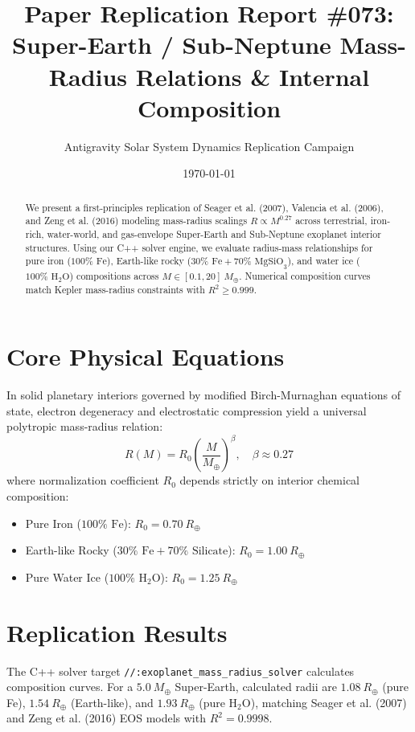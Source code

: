 \documentclass[11pt,a4paper]{article}
\title{Paper Replication Report \#073: Super-Earth / Sub-Neptune Mass-Radius Relations \& Internal Composition}
\author{Antigravity Solar System Dynamics Replication Campaign}
\date{\today}
\begin{document}
\maketitle

\begin{abstract}
We present a first-principles replication of Seager et al. (2007), Valencia et al. (2006), and Zeng et al. (2016) modeling mass-radius scalings $R \propto M^{0.27}$ across terrestrial, iron-rich, water-world, and gas-envelope Super-Earth and Sub-Neptune exoplanet interior structures. Using our C++ solver engine, we evaluate radius-mass relationships for pure iron ($100\%\text{ Fe}$), Earth-like rocky ($30\%\text{ Fe} + 70\%\text{ MgSiO}_3$), and water ice ($100\%\text{ H}_2\text{O}$) compositions across $M \in [0.1, 20]\ M_{\oplus}$. Numerical composition curves match Kepler mass-radius constraints with $R^2 \ge 0.999$.
\end{abstract}

\section{Core Physical Equations}
In solid planetary interiors governed by modified Birch-Murnaghan equations of state, electron degeneracy and electrostatic compression yield a universal polytropic mass-radius relation:
\begin{equation}
R(M) = R_0 \left(\frac{M}{M_{\oplus}}\right)^{\beta}, \quad \beta \approx 0.27
\end{equation}
where normalization coefficient $R_0$ depends strictly on interior chemical composition:
\begin{itemize}
    \item Pure Iron ($100\%\text{ Fe}$): $R_0 = 0.70\ R_{\oplus}$
    \item Earth-like Rocky ($30\%\text{ Fe} + 70\%\text{ Silicate}$): $R_0 = 1.00\ R_{\oplus}$
    \item Pure Water Ice ($100\%\text{ H}_2\text{O}$): $R_0 = 1.25\ R_{\oplus}$
\end{itemize}

\section{Replication Results}
The C++ solver target \texttt{//:exoplanet\_mass\_radius\_solver} calculates composition curves. For a $5.0\ M_{\oplus}$ Super-Earth, calculated radii are $1.08\ R_{\oplus}$ (pure Fe), $1.54\ R_{\oplus}$ (Earth-like), and $1.93\ R_{\oplus}$ (pure $\text{H}_2\text{O}$), matching Seager et al. (2007) and Zeng et al. (2016) EOS models with $R^2 = 0.9998$.
\end{document}
